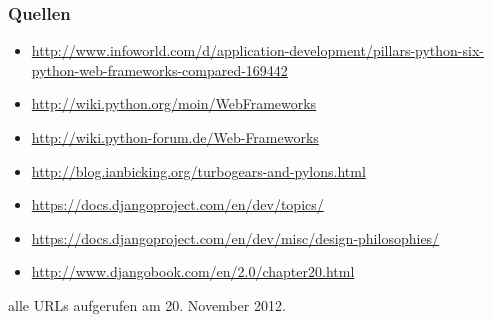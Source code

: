 \documentclass[
    t,
    smaller,
    compress,
    xcolor=svgnames,            %
    table,
]{beamer}
\begin{document}
\begin{frame}
  \frametitle{Quellen}

  {\footnotesize

  \printbibliography
  \begin{itemize}[<1->]
    \item \url{http://www.infoworld.com/d/application-development/pillars-python-six-python-web-frameworks-compared-169442}
    \item \url{http://wiki.python.org/moin/WebFrameworks}
    \item \url{http://wiki.python-forum.de/Web-Frameworks}
    \item \url{http://blog.ianbicking.org/turbogears-and-pylons.html}
    \item \url{https://docs.djangoproject.com/en/dev/topics/}
    \item \url{https://docs.djangoproject.com/en/dev/misc/design-philosophies/}
    \item \url{http://www.djangobook.com/en/2.0/chapter20.html}
  \end{itemize}

  alle URLs aufgerufen am 20. November 2012.
  }
\end{frame}
\end{document}
